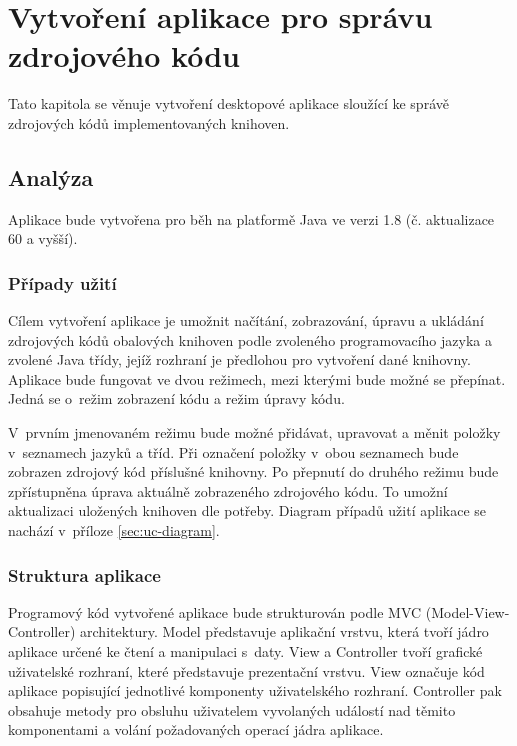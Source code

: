 \documentclass[czech,BP]{thesiskiv}
\begin{document}
\chapter{Vytvoření aplikace pro správu zdrojového kódu}
Tato kapitola se věnuje vytvoření desktopové aplikace sloužící ke správě zdrojových kódů implementovaných knihoven.

\section{Analýza}
Aplikace bude vytvořena pro běh na platformě Java ve verzi 1.8 (č. aktualizace 60 a vyšší).

\subsection{Případy užití}
Cílem vytvoření aplikace je umožnit načítání, zobrazování, úpravu a ukládání zdrojových kódů obalových knihoven podle zvoleného programovacího jazyka a zvolené Java třídy, jejíž rozhraní je předlohou pro vytvoření dané knihovny. Aplikace bude fungovat ve dvou režimech, mezi kterými bude možné se přepínat. Jedná se o~režim zobrazení kódu a režim úpravy kódu.\par
V~prvním jmenovaném režimu bude možné přidávat, upravovat a měnit položky v~seznamech jazyků a tříd. Při označení položky v~obou seznamech bude zobrazen zdrojový kód příslušné knihovny. Po přepnutí do druhého režimu bude zpřístupněna úprava aktuálně zobrazeného zdrojového kódu. To umožní aktualizaci uložených knihoven dle potřeby. Diagram případů užití aplikace se nachází v~příloze \ref{sec:uc-diagram}.

\subsection{Struktura aplikace}
Programový kód vytvořené aplikace bude strukturován podle MVC (Model-View-Controller) architektury. Model představuje aplikační vrstvu, která tvoří jádro aplikace určené ke čtení a manipulaci s~daty. View a Controller tvoří grafické uživatelské rozhraní, které představuje prezentační vrstvu. View označuje kód aplikace popisující jednotlivé komponenty uživatelského rozhraní. Controller pak obsahuje metody pro obsluhu uživatelem vyvolaných událostí nad těmito komponentami a volání požadovaných operací jádra aplikace.
\end{document}
